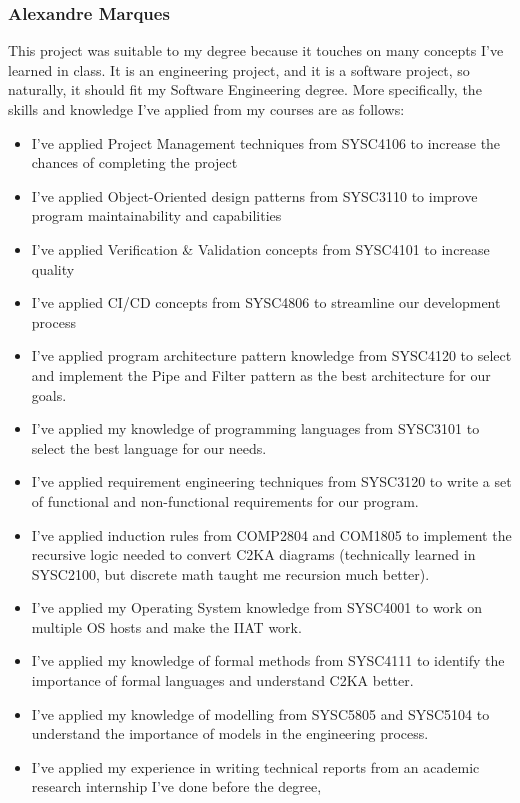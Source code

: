 \subsubsection{Alexandre Marques}
This project was suitable to my degree because it touches on many concepts I've learned in class.
It is an engineering project, and it is a software project, so naturally, it should fit my Software Engineering degree.
More specifically, the skills and knowledge I've applied from my courses are as follows:
\begin{itemize}
    \item I've applied Project Management techniques from SYSC4106 to increase the chances of completing the project
    \item I've applied Object-Oriented design patterns from SYSC3110 to improve program maintainability and capabilities
    \item I've applied Verification \& Validation concepts from SYSC4101 to increase quality
    \item I've applied CI/CD concepts from SYSC4806 to streamline our development process
    \item I've applied program architecture pattern knowledge from SYSC4120 to select and implement the Pipe and Filter pattern as the best architecture for our goals.
    \item I've applied my knowledge of programming languages from SYSC3101 to select the best language for our needs.
    \item I've applied requirement engineering techniques from SYSC3120 to write a set of functional and non-functional requirements for our program.
    \item I've applied induction rules from COMP2804 and COM1805 to implement the recursive logic needed to convert C2KA diagrams (technically learned in SYSC2100, but discrete math taught me recursion much better).
    \item I've applied my Operating System knowledge from SYSC4001 to work on multiple OS hosts and make the IIAT work.
    \item I've applied my knowledge of formal methods from SYSC4111 to identify the importance of formal languages and understand C2KA better.
    \item I've applied my knowledge of modelling from SYSC5805 and SYSC5104 to understand the importance of models in the engineering process.
    \item I've applied my experience in writing technical reports from an academic research internship I've done before the degree,

\end{itemize}
